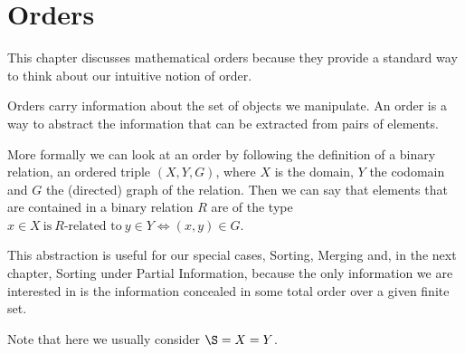 \section{Orders}

This chapter discusses mathematical orders because they provide a standard
way to think about our intuitive notion of order.

Orders carry information about the set of objects we manipulate. An order is a
way to abstract the information that can be extracted from pairs of elements.

More formally we can look at an order by following the definition of a binary
relation, \ie an ordered triple $(X, Y, G)$, where $X$ is the domain, $Y$ the
codomain and $G$ the (directed) graph of the relation.
Then we can say that elements that are contained in a binary relation $R$ are
of the type $x \in X~\text{is}~R\text{-related to}~y \in Y \iff (x, y) \in G$.

This abstraction is useful for our special cases, \ie Sorting, Merging and, in
the next chapter, Sorting under Partial Information, because the only
information we are interested in is the information concealed in some total
order over a given finite set.

Note that here we usually consider \(\S = X = Y\).
